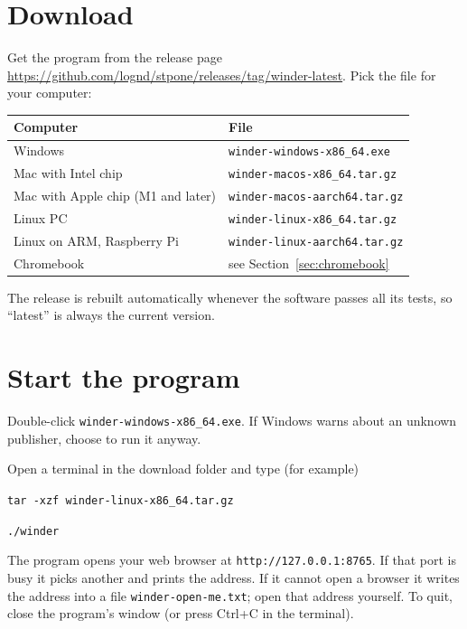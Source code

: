 \section{Download}
Get the program from the release page
\url{https://github.com/lognd/stpone/releases/tag/winder-latest}. Pick the file
for your computer:
\begin{center}
\renewcommand{\arraystretch}{1.3}
\begin{tabularx}{\textwidth}{@{}>{\raggedright\arraybackslash}p{}>{\raggedright\arraybackslash}X@{}}
\toprule
\textbf{Computer} & \textbf{File} \\
\midrule
Windows & \texttt{winder-windows-x86\_64.exe} \\
Mac with Intel chip & \texttt{winder-macos-x86\_64.tar.gz} \\
Mac with Apple chip (M1 and later) & \texttt{winder-macos-aarch64.tar.gz} \\
Linux PC & \texttt{winder-linux-x86\_64.tar.gz} \\
Linux on ARM, Raspberry Pi & \texttt{winder-linux-aarch64.tar.gz} \\
Chromebook & see Section~\ref{sec:chromebook} \\
\bottomrule
\end{tabularx}
\end{center}
The release is rebuilt automatically whenever the software passes all its
tests, so ``latest'' is always the current version.

\section{Start the program}
\begin{description}[style=nextline,leftmargin=1.5em]
  \item[Windows] Double-click \texttt{winder-windows-x86\_64.exe}. If Windows
    warns about an unknown publisher, choose to run it anyway.
  \item[Mac and Linux] Open a terminal in the download folder and type (for
    example)\par
    \texttt{tar -xzf winder-linux-x86\_64.tar.gz}\par
    \texttt{./winder}
\end{description}
The program opens your web browser at \texttt{http://127.0.0.1:8765}. If that
port is busy it picks another and prints the address. If it cannot open a
browser it writes the address into a file \texttt{winder-open-me.txt}; open
that address yourself. To quit, close the program's window (or press
Ctrl+C in the terminal).

